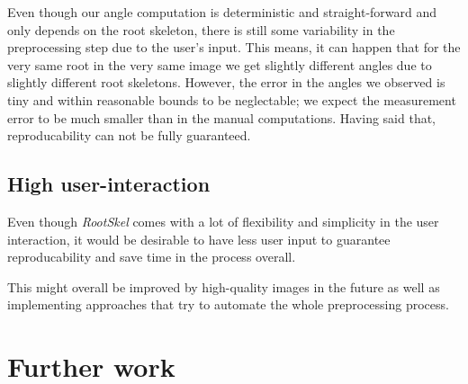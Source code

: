 Even though our angle computation is deterministic and straight-forward and only depends on the root skeleton, there is still some variability in the preprocessing step due to the user's input. This means, it can happen that for the very same root in the very same image we get slightly different angles due to slightly different root skeletons. %
However, the error in the angles we observed is tiny and within reasonable bounds to be neglectable; we expect the measurement error to be much smaller than in the manual computations. Having said that, reproducability can not be fully guaranteed. %


\subsection{High user-interaction}

Even though \textit{RootSkel} comes with a lot of flexibility and simplicity in the user interaction, it would be desirable to have less user input to guarantee reproducability and save time in the process overall. 

This might overall be improved by high-quality images in the future as well as implementing approaches that try to automate the whole preprocessing process.








 
\section{Further work}

